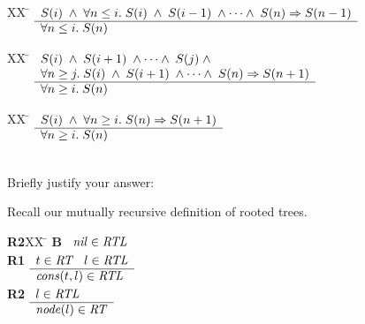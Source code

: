 \documentclass[addpoints]{exam}
\begin{document}
\begin{questions}
\begin{parts}
\begin{tabbing}
[b]XX \=  \kill
[b] \>
	\(\begin{array}[t]{l}
	S(i) \;\wedge\; \forall n \leq i.\;S(i)\;\wedge\;S(i-1)\;\wedge\cdots\wedge\;S(n) \Rightarrow S(n-1) \\
	\hline
	\forall n \leq i. \; S(n)
	\end{array}\)
\end{tabbing}


\begin{tabbing}
[c]XX \=  \kill
[c] \>
	\(\begin{array}[t]{l}
	S(i) \;\wedge\; S(i+1)\;\wedge\cdots\wedge\;S(j)\;\wedge\; \\
\forall n \geq j.\;S(i)\;\wedge\;S(i+1)\;\wedge\cdots\wedge\;S(n) \Rightarrow S(n+1) \\
	\hline
	\forall n \geq i. \; S(n)
	\end{array}\) %
\end{tabbing}

\begin{tabbing}
[d]XX \=  \kill
[d] \>
	\(\begin{array}[t]{l}
	S(i) \;\wedge\; \forall n \geq i.\;S(n) \Rightarrow S(n+1) \\
	\hline
	\forall n \geq i. \; S(n)
	\end{array}\) %
\end{tabbing}
~\\Briefly justify your answer:
\end{parts}




\vspace{25mm}
\clearpage



\vspace{25mm}



\vspace{25mm}

\question[3] 
Recall our mutually recursive definition of rooted trees.
\begin{tabbing}
{\bf R2}XX \=  \kill
{\bf B} \>
        \(\begin{array}[t]{l}
        \mbox{\it nil\/}\in\mbox{\it RTL\/}
        \end{array}\) \\[2ex]
{\bf R1} \>
        \(\begin{array}[t]{l}
        t\in\mbox{\it RT\/}\;\;\;l\in\mbox{\it RTL\/} \\
        \hline
        \mbox{\it cons\/}(t,l)\in\mbox{\it RTL\/}
        \end{array}\) \\[2ex]
{\bf R2} \>
        \(\begin{array}[t]{l}
        l\in\mbox{\it RTL\/} \\
        \hline
        \mbox{\it node\/}(l)\in\mbox{\it RT\/}
        \end{array}\)
\end{tabbing}


\end{questions}
\end{document}
